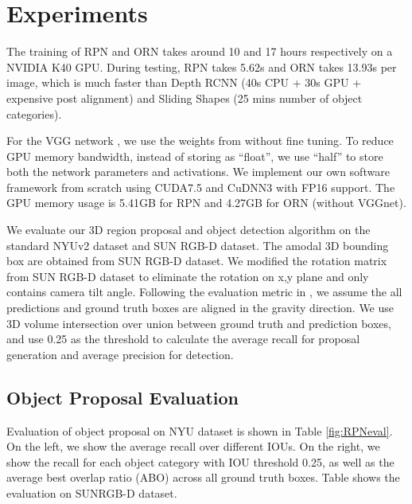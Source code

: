 \documentclass[10pt,twocolumn,letterpaper]{article}
\begin{document}
\vspace{-1mm}
\section{Experiments}
\vspace{-1mm}

The training of RPN and ORN takes around 10 and 17 hours respectively on a NVIDIA K40 GPU. 
During testing, RPN takes 5.62s and ORN takes 13.93s per image, which is much faster than Depth RCNN (40s CPU + 30s GPU + expensive post alignment) and Sliding Shapes (25 mins  number of object categories).

For the VGG network \cite{vggnet}, we use the weights from \cite{gupta2015cross} without fine tuning.
To reduce GPU memory bandwidth, instead of storing as ``float'', we use ``half'' to store both the network parameters and activations. 
We implement our own software framework from scratch using CUDA7.5 and CuDNN3 with FP16 support. 
The GPU memory usage is 5.41GB for RPN and 4.27GB for ORN (without VGGnet).

We evaluate our 3D region proposal and object detection algorithm on the standard NYUv2 dataset \cite{NYUdataset} and SUN RGB-D \cite{SUNRGBD} dataset. 
The amodal 3D bounding box are obtained from SUN RGB-D dataset. We modified the rotation matrix from SUN RGB-D dataset to 
eliminate the rotation on x,y plane and only contains camera tilt angle.
 Following the evaluation metric in \cite{SlidingShapes}, we assume the all predictions and ground truth boxes are aligned in the gravity direction. 
We use 3D volume intersection over union between ground truth and prediction boxes, and use 0.25 as the threshold to calculate the average recall for proposal generation and average precision for detection.


\subsection{Object Proposal Evaluation}
Evaluation of object proposal on NYU dataset is shown in Table \ref{fig:RPNeval}. On the left, we show the average recall over different IOUs.
On the right, we show the recall for each object category with IOU threshold 0.25, as well as the average best overlap ratio (ABO) across all ground truth boxes. 
Table \label{fig:resultRPN} shows the evaluation on SUNRGB-D dataset.
\end{document}
